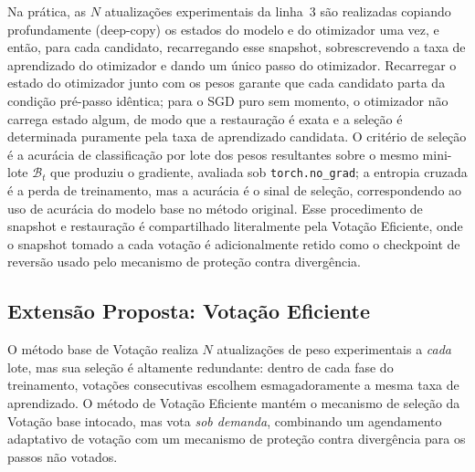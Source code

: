 \documentclass[conference]{IEEEtran}
\begin{document}
Na prática, as $N$ atualizações experimentais da linha~3 são realizadas copiando profundamente (deep-copy) os estados do modelo e do otimizador uma vez, e então, para cada candidato, recarregando esse snapshot, sobrescrevendo a taxa de aprendizado do otimizador e dando um único passo do otimizador. Recarregar o estado do otimizador junto com os pesos garante que cada candidato parta da condição pré-passo idêntica; para o SGD puro sem momento, o otimizador não carrega estado algum, de modo que a restauração é exata e a seleção é determinada puramente pela taxa de aprendizado candidata. O critério de seleção é a acurácia de classificação por lote dos pesos resultantes sobre o mesmo mini-lote $\mathcal{B}_t$ que produziu o gradiente, avaliada sob \texttt{torch.no\_grad}; a entropia cruzada é a perda de treinamento, mas a acurácia é o sinal de seleção, correspondendo ao uso de acurácia do modelo base no método original. Esse procedimento de snapshot e restauração é compartilhado literalmente pela Votação Eficiente, onde o snapshot tomado a cada votação é adicionalmente retido como o checkpoint de reversão usado pelo mecanismo de proteção contra divergência.

\subsection{Extensão Proposta: Votação Eficiente}

O método base de Votação realiza $N$ atualizações de peso experimentais a \emph{cada} lote, mas sua seleção é altamente redundante: dentro de cada fase do treinamento, votações consecutivas escolhem esmagadoramente a mesma taxa de aprendizado. O método de Votação Eficiente mantém o mecanismo de seleção da Votação base intocado, mas vota \emph{sob demanda}, combinando um agendamento adaptativo de votação com um mecanismo de proteção contra divergência para os passos não votados.
\end{document}
